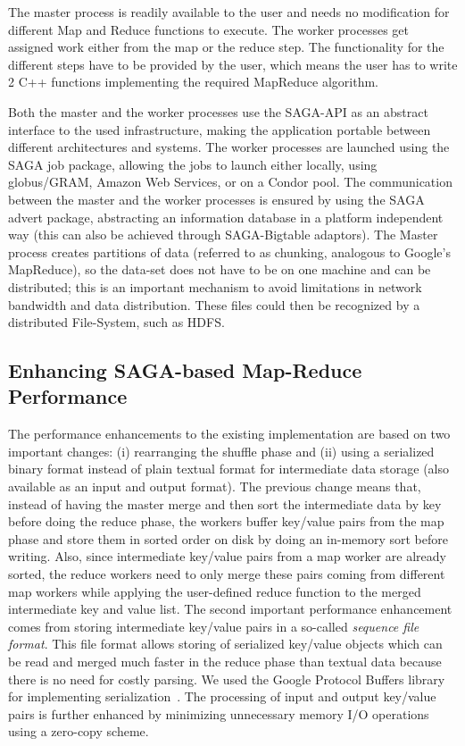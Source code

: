 \documentclass[3p,twocolumn]{elsarticle}
\begin{document}
The master process is readily available to the user and needs no
modification for different Map and Reduce functions to execute.  The
worker processes get assigned work either from the map or the reduce
step. The functionality for the different steps have to be provided by
the user, which means the user has to write 2 C++ functions
implementing the required MapReduce algorithm.

Both the master and the worker processes use the SAGA-API as an
abstract interface to the used infrastructure, making the application
portable between different architectures and systems. The worker
processes are launched using the SAGA job package, allowing the jobs
to launch either locally, using globus/GRAM, Amazon Web Services, or
on a Condor pool. The communication between the master and the worker
processes is ensured by using the SAGA advert package, abstracting an
information database in a platform independent way (this can also be
achieved through SAGA-Bigtable adaptors).  The Master process creates
partitions of data (referred to as chunking, analogous to Google's
MapReduce), so the data-set does not have to be on one machine and can
be distributed; this is an important mechanism to avoid limitations in
network bandwidth and data distribution.  These files could then be
recognized by a distributed File-System, such as HDFS.

\subsection{Enhancing SAGA-based Map-Reduce Performance}


The performance enhancements to the existing \sagamapreduce implementation
are based on two important changes: (i) rearranging the shuffle phase and (ii)
using a serialized binary format instead of plain textual format for intermediate
data storage (also available as an input and output format).  The previous
change means that, instead of having the master merge and then sort the
intermediate data by key before doing the reduce phase, the workers buffer
key/value pairs from the map phase and store them in sorted order
on disk by doing an in-memory sort before writing. Also, since intermediate
key/value pairs from a map worker are already sorted, the reduce workers need
to only merge these pairs coming from different map workers while applying the
user-defined reduce function to the merged intermediate key and value list.
The second important performance enhancement comes from storing intermediate
key/value pairs in a so-called \emph{sequence file format}. This file format
allows storing of serialized key/value objects which can be read and merged
much faster in the reduce phase than textual data because there is no need for
costly parsing.  We used the Google Protocol Buffers library for implementing
serialization~\cite{protobuf}.
The processing of input and output key/value pairs is further enhanced by
minimizing unnecessary memory I/O operations using a zero-copy scheme.
\end{document}
